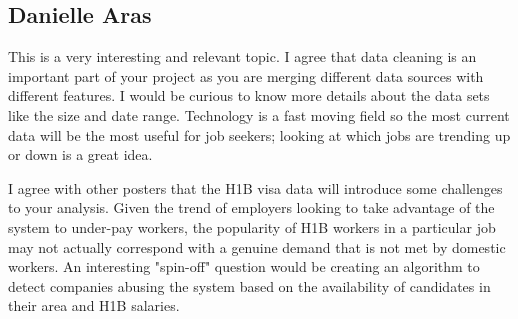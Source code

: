 \subsection*{Danielle Aras}
This is a very interesting and relevant topic. I agree that data cleaning is an important part of your project as you are merging different data sources with different features. I would be curious to know more details about the data sets like the size and date range. Technology is a fast moving field so the most current data will be the most useful for job seekers; looking at which jobs are trending up or down is a great idea.

I agree with other posters that the H1B visa data will introduce some challenges to your analysis. Given the trend of employers looking to take advantage of the system to under-pay workers, the popularity of H1B workers in a particular job may not actually correspond with a genuine demand that is not met by domestic workers. An interesting "spin-off" question would be creating an algorithm to detect companies abusing the system based on the availability of candidates in their area and H1B salaries.







